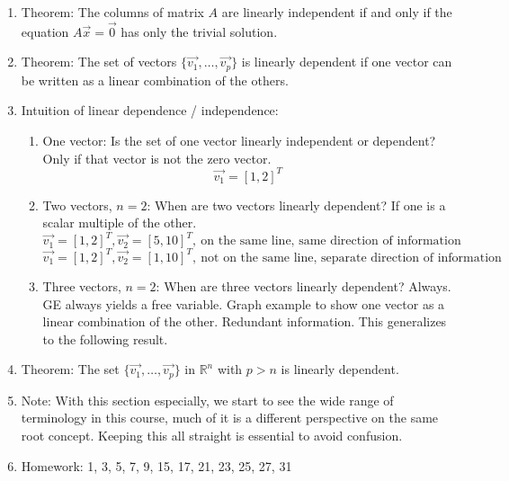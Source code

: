\documentclass{article}
\begin{document}
\begin{enumerate}
\item Theorem: The columns of matrix $A$ are linearly independent if and only if the equation $A\vec{x} = \vec{0}$ has only the trivial solution.


\item Theorem: The set of vectors $\{ \vec{v_1}, \dots, \vec{v_p} \}$ is linearly dependent if one vector can be written as a linear combination of the others.

\item Intuition of linear dependence / independence:
\begin{enumerate}
\item One vector: Is the set of one vector linearly independent or dependent? Only if that vector is not the zero vector.
\[
\vec{v_1} = [1,2]^T
\]

\item Two vectors, $n=2$: When are two vectors linearly dependent? If one is a scalar multiple of the other.
\[
\vec{v_1} = [1,2]^T, \vec{v_2} = [5,10]^T, ~\text{on the same line, same direction of information}
\]
\[
\vec{v_1} = [1,2]^T, \vec{v_2} = [1,10]^T, ~\text{not on the same line, separate direction of information}
\]

\item Three vectors, $n=2$: When are three vectors linearly dependent? Always. GE always yields a free variable. Graph example to show one vector as a linear combination of the other. Redundant information. This generalizes to the following result.
\end{enumerate}

\item Theorem: The set $\{ \vec{v_1}, \dots, \vec{v_p} \}$ in $\mathbb{R}^n$ with $p > n$ is linearly dependent.

\item Note: With this section especially, we start to see the wide range of terminology in this course, much of it is a different perspective on the same root concept. Keeping this all straight is essential to avoid confusion.

\item Homework: 1, 3, 5, 7, 9, 15, 17, 21, 23, 25, 27, 31

\end{enumerate}
\end{document}
